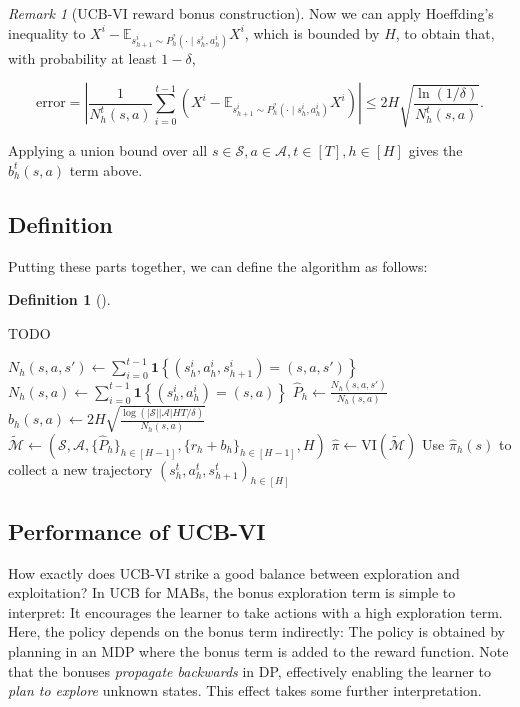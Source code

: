 \documentclass[
  letterpaper,
  DIV=11,
  numbers=noendperiod]{scrreprt}
\theoremstyle{plain}
\theoremstyle{plain}
\theoremstyle{definition}
\theoremstyle{definition}
\newtheorem{definition}{Definition}[chapter]
\theoremstyle{remark}
\newtheorem{refremark}{Remark}[chapter]
\begin{document}
\begin{refremark}[UCB-VI reward bonus construction]
Now we can apply Hoeffding's inequality to
\(X^i - \mathbb{E}_{s_{h+1}^i \sim P^?_{h}(\cdot \mid s_h^i, a_h^i)} X^i\),
which is bounded by \(H\), to obtain that, with probability at least
\(1-\delta\),

\[
\text{error} = \left| \frac{1}{N^t_h(s, a)} \sum_{i=0}^{t-1} \left(X^i - \mathbb{E}_{s_{h+1}^i \sim P^?_{h}(\cdot \mid s_h^i, a_h^i)} X^i \right) \right| \le 2 H \sqrt{\frac{\ln(1/\delta)}{N_h^t(s, a)}}.
\]

Applying a union bound over all
\(s \in \mathcal{S}, a \in \mathcal{A}, t \in [T], h \in [H]\) gives the
\(b_h^t(s, a)\) term above.

\label{rem-ucb_vi_bonus}

\end{refremark}

\subsection{Definition}\label{definition-1}

Putting these parts together, we can define the algorithm as follows:

\begin{definition}[]\protect\hypertarget{def-ucb-vi}{}\label{def-ucb-vi}

TODO

\end{definition}

\(N_h(s, a, s') \gets \sum_{i=0}^{t-1} \mathbf{1}\left\{ (s_h^i, a_h^i, s_{h+1}^i) = (s, a, s') \right\}\)
\(N_h(s, a) \gets \sum_{i=0}^{t-1} \mathbf{1}\left\{ (s_h^i, a_h^i) = (s, a) \right\}\)
\(\widehat P_h\gets \frac{N_h(s, a, s')}{N_h(s, a)}\)
\(b_h(s, a) \gets 2 H \sqrt{\frac{\log( |\mathcal{S}||\mathcal{A}|H T/\delta )}{N_h(s, a)}}\)
\(\tilde{\mathcal{M}} \gets (\mathcal{S}, \mathcal{A}, \{ \widehat{P}_h\}_{h \in [H-1]}, \{ r_h+ b_h\}_{h \in [H-1]}, H)\)
\(\widehat \pi \gets \text{VI}(\tilde{\mathcal{M}})\) Use
\(\widehat \pi_h(s)\) to collect a new trajectory
\((s^t_h, a^t_h, s^t_{h+1})_{h\in [H]}\)

\subsection{Performance of UCB-VI}\label{performance-of-ucb-vi}

How exactly does UCB-VI strike a good balance between exploration and
exploitation? In UCB for MABs, the bonus exploration term is simple to
interpret: It encourages the learner to take actions with a high
exploration term. Here, the policy depends on the bonus term indirectly:
The policy is obtained by planning in an MDP where the bonus term is
added to the reward function. Note that the bonuses \emph{propagate
backwards} in DP, effectively enabling the learner to \emph{plan to
explore} unknown states. This effect takes some further interpretation.
\end{document}
